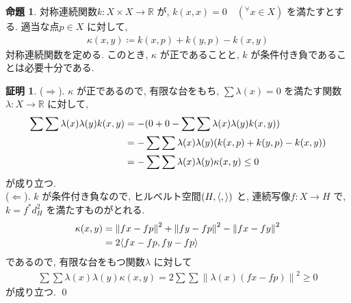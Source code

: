\documentclass[10pt, fleqn, label-section=none]{bxjsarticle}
\theoremstyle{definition}
\newtheorem{prop}[dfn]{命題}
\newtheorem*{pf*}{証明}
\newcommand{\any}{{}^{\forall}}
\newcommand{\paren}[1]{\mleft( #1\mright )}
\newcommand{\tbra}[1]{\mleft\langle#1\mright\rangle}
\newcommand{\norm}[1]{\left\|#1\right\|}
\newcommand{\naraba}{\Rightarrow}
\newcommand{\gyaku}{\Leftarrow}
\renewcommand{\;}{\, ; \,}
\begin{document}
\begin{prop}対称連続関数$k: X \times X \rightarrow \mathbb R$ が, $k(x, x) = 0 \quad ( \any x \in X)$ を満たすとする. 適当な点$p \in X$ に対して, 
\begin{align*} \kappa (x, y) \coloneqq k(x, p) + k(y, p) - k(x, y) \end{align*}
対称連続関数を定める. このとき, $\kappa$ が正であることと, $k$ が条件付き負であることは必要十分である. 
\end{prop}
\begin{pf*}($\naraba$). $\kappa$ が正であるので, 有限な台をもち, $\sum \lambda(x) = 0$ を満たす関数$\lambda : X \rightarrow \mathbb R$ に対して, 
\begin{align*} \sum \sum \lambda(x) \lambda(y)k(x, y) &= - (0 + 0 - \sum \sum \lambda(x) \lambda(y)k(x, y) ) \\&=  - \sum \sum \lambda(x) \lambda(y) \paren{k(x, p) + k(y, p) - k(x, y)} \\&= - \sum \sum \lambda(x) \lambda(y) \kappa (x, y)  \leq 0  \end{align*}
が成り立つ.  \\
($\gyaku$). $k$ が条件付き負なので, ヒルベルト空間$(H, \tbra{, })$ と, 連続写像$f : X \rightarrow H$ で, $k = f^* d_{H}^2$ を満たすものがとれる. 
\begin{align*} \kappa (x, y) &= \norm{fx - fp}^2 + \norm{fy - fp}^2 - \norm{fx - fy}^2 \\&= 2\tbra{fx- fp, fy - fp}\end{align*}
であるので, 有限な台をもつ関数$\lambda$ に対して
\begin{align*} \sum \sum \lambda(x) \lambda(y) \kappa(x, y) = 2 \sum \sum \norm{\lambda (x) (fx - fp)}^2 \geq 0  \end{align*}
が成り立つ. 
\qed
\end{pf*}
\end{document}
